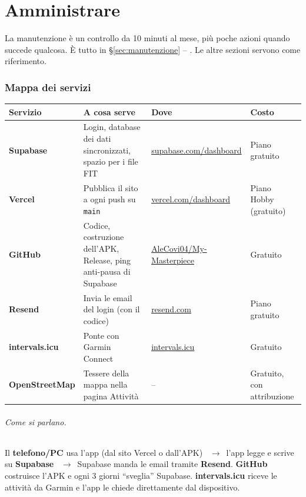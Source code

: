 \documentclass[11pt,a4paper]{article}
\newcommand{\thead}[1]{\textbf{\color{accent}#1}}
\newcommand{\ra}{\unskip\nobreak\ $\rightarrow$\ \ignorespaces}            %
\newcommand{\bt}[1]{\textbf{#1}}               %
\newcommand{\code}[1]{\texttt{#1}}             %
\newcommand{\sezione}[1]{\S\ref{#1}}           %
\newcommand{\repo}{https://github.com/AleCovi04/My-Masterpiece}
\begin{document}
\part{Amministrare}

\begin{importante}
La manutenzione è un controllo da 10 minuti al mese, più poche azioni quando succede qualcosa.
È tutto in \sezione{sec:manutenzione} -- . Le altre sezioni servono come riferimento.
\end{importante}

\section{Mappa dei servizi}\label{sec:servizi}

\begin{tabularx}{\textwidth}{L{2.9cm}YL{4.1cm}L{2.5cm}}
  \toprule \thead{Servizio} & \thead{A cosa serve} & \thead{Dove} & \thead{Costo} \\ \midrule
  \bt{Supabase} & Login, database dei dati sincronizzati, spazio per i file FIT &
    \href{https://supabase.com/dashboard}{supabase.com/dashboard} & Piano gratuito \\
  \bt{Vercel} & Pubblica il sito a ogni push su \code{main} &
    \href{https://vercel.com/dashboard}{vercel.com/dashboard} & Piano Hobby (gratuito) \\
  \bt{GitHub} & Codice, costruzione dell'APK, Release, ping anti-pausa di Supabase &
    \href{\repo}{AleCovi04/My-Masterpiece} & Gratuito \\
  \bt{Resend} & Invia le email del login (con il codice) &
    \href{https://resend.com}{resend.com} & Piano gratuito \\
  \bt{intervals.icu} & Ponte con Garmin Connect & \href{https://intervals.icu}{intervals.icu} & Gratuito \\
  \bt{OpenStreetMap} & Tessere della mappa nella pagina Attività & -- &
    Gratuito, con attribuzione \\
\bottomrule
\end{tabularx}

\paragraph{Come si parlano.} Il \bt{telefono/PC} usa l'app (dal sito Vercel o dall'APK) \ra l'app
legge e scrive su \bt{Supabase} \ra Supabase manda le email tramite \bt{Resend}. \bt{GitHub}
costruisce l'APK e ogni 3 giorni ``sveglia'' Supabase. \bt{intervals.icu} riceve le attività da
Garmin e l'app le chiede direttamente dal dispositivo.
\end{document}
